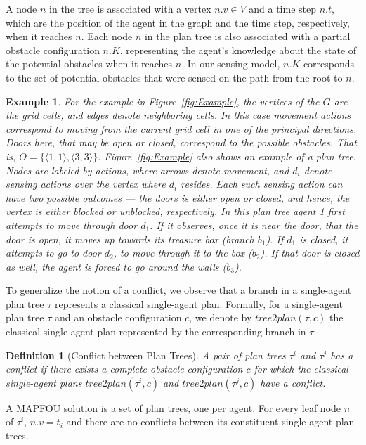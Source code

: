\documentclass[letterpaper]{article} %
\newcommand{\toplan}{\textit{tree2plan}}
\newtheorem{exmp}{Example}
\newtheorem{definition}{Definition}
\begin{document}
A node $n$ in the tree is associated with a vertex $n.v \in V$ and a time step $n.t$, which are the position of the agent in the graph and the time step, respectively, when it reaches $n$.
Each node $n$ in the plan tree is also associated with a partial obstacle configuration $n.K$, representing the agent's knowledge about the state of the potential obstacles when it reaches $n$. In our sensing model, $n.K$ corresponds to the set of potential obstacles that were sensed on the path from the root to $n$.
\begin{exmp}
For the example in Figure~\ref{fig:Example}, the vertices of the $G$ are the grid cells, and edges denote neighboring cells. In this case movement actions correspond to moving from the current grid cell in one of the principal directions.
Doors here, that may be open or closed, correspond to the possible obstacles. That is, $O=\{ \langle 1,1 \rangle, \langle 3,3 \rangle \}$.
Figure~\ref{fig:Example} also shows an example of a plan tree. Nodes are labeled by actions, where arrows denote movement, and $d_i$ denote sensing actions over the vertex where $d_i$ resides. Each such sensing action can have two possible outcomes --- the doors is either open or closed, and hence, the vertex is either blocked or unblocked, respectively.
In this plan tree agent 1 first attempts to move through door $d_1$. If it observes, once it is near the door, that the door is open, it moves up towards its treasure box (branch $b_1$). If $d_1$ is closed, it attempts to go to door $d_2$, to move through it to the box ($b_2$). If that door is closed as well, the agent is forced to go around the walls ($b_3$).
\end{exmp}
To generalize the notion of a conflict, we observe that a
branch in a single-agent plan tree $\tau$ represents a classical single-agent plan. Formally, for a single-agent plan tree $\tau$ and an obstacle configuration $c$, we denote by $\toplan(\tau,c)$ the classical single-agent plan represented by the corresponding branch in $\tau$.
\begin{definition}[Conflict between Plan Trees]
A pair of plan trees $\tau^i$ and $\tau^j$ has a conflict if there exists a complete obstacle configuration $c$
for which the classical single-agent plans $\toplan(\tau^i,c)$ and $\toplan(\tau^j,c)$ have a conflict.
\label{def:conflicting-plan-trees}
\end{definition}
A  MAPFOU solution is a set of plan trees, one per agent. For every leaf node $n$ of $\tau^i$, $n.v=t_i$ and there are no conflicts between its constituent single-agent plan trees.
\end{document}
